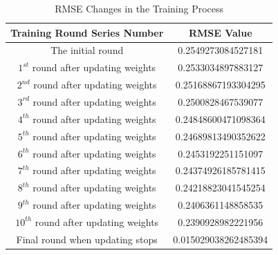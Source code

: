\documentclass[a4paper, article, oneside, USenglish, IN5460]{memoir}
\begin{document}
{\begin{table}[htbp] %
    \centering %
    \caption{RMSE Changes in the Training Process } %
    \label{tab:example} %
    \begin{tabular}{|c|c|} %
        \hline %
        Training Round Series Number & RMSE Value \\ %
        \hline %
        The initial round & 0.2549273084527181 \\ %
        $1^{st}$ round after updating weights & 0.2533034897883127 \\ %
        $2^{nd}$ round after updating weights &  0.25168867193304295 \\ %
        $3^{rd}$ round after updating weights & 0.2500828467539077 \\ %
        $4^{th}$ round after updating weights & 0.24848600471098364 \\ %
        $5^{th}$ round after updating weights & 0.24689813490352622 \\ %
        $6^{th}$ round after updating weights & 0.2453192251151097 \\ %
        $7^{th}$ round after updating weights & 0.24374926185781415 \\ %
        $8^{th}$ round after updating weights & 0.24218823041545254 \\ %
        $9^{th}$ round after updating weights & 0.2406361148858535\\ %
        $10^{th}$ round after updating weights & 0.2390928982221956 \\ %
        Final round when updating stops & 0.015029038262485394 \\ %
        
        
        \hline %
    \end{tabular}
\end{table}

}
\end{document}
